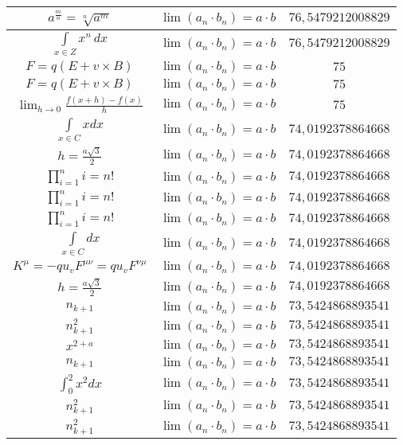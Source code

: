 \documentclass{article}
\begin{document}
\begin{flushleft}
\begin{longtable}{|c|c|c|}
$a^{\frac{m}{n}}=\sqrt[n]{a^{m}}$ & $\lim\left(a_n\cdot b_n\right)=a\cdot b$ & $76,5479212008829$ \\ \hline 
$\int \limits_{x\in Z}\!x^{n}\,dx$ & $\lim\left(a_n\cdot b_n\right)=a\cdot b$ & $76,5479212008829$ \\ \hline 
$F=q\left(E+v\times B\right)$ & $\lim\left(a_n\cdot b_n\right)=a\cdot b$ & $75$ \\ \hline 
$F=q\left(E+v\times B\right)$ & $\lim\left(a_n\cdot b_n\right)=a\cdot b$ & $75$ \\ \hline 
$\lim_{h\to0}\frac{f(x+h)-f(x)}{h}$ & $\lim\left(a_n\cdot b_n\right)=a\cdot b$ & $75$ \\ \hline 
$\int \limits_{x\in C}xdx$ & $\lim\left(a_n\cdot b_n\right)=a\cdot b$ & $74,0192378864668$ \\ \hline 
$h=\frac{a\sqrt{3}}{2}$ & $\lim\left(a_n\cdot b_n\right)=a\cdot b$ & $74,0192378864668$ \\ \hline 
$\prod_{i=1}^ni=n!$ & $\lim\left(a_n\cdot b_n\right)=a\cdot b$ & $74,0192378864668$ \\ \hline 
$\prod_{i=1}^ni=n!$ & $\lim\left(a_n\cdot b_n\right)=a\cdot b$ & $74,0192378864668$ \\ \hline 
$\prod_{i=1}^ni=n!$ & $\lim\left(a_n\cdot b_n\right)=a\cdot b$ & $74,0192378864668$ \\ \hline 
$\int \limits_{x\in C}dx$ & $\lim\left(a_n\cdot b_n\right)=a\cdot b$ & $74,0192378864668$ \\ \hline 
$K^\mu=-qu_vF^{\mu\nu}=qu_vF^{\nu\mu}$ & $\lim\left(a_n\cdot b_n\right)=a\cdot b$ & $74,0192378864668$ \\ \hline 
$h=\frac{a\sqrt{3}}{2}$ & $\lim\left(a_n\cdot b_n\right)=a\cdot b$ & $74,0192378864668$ \\ \hline 
$n_{k+1}$ & $\lim\left(a_n\cdot b_n\right)=a\cdot b$ & $73,5424868893541$ \\ \hline 
$n_{k+1}^2$ & $\lim\left(a_n\cdot b_n\right)=a\cdot b$ & $73,5424868893541$ \\ \hline 
$x^{2+a}$ & $\lim\left(a_n\cdot b_n\right)=a\cdot b$ & $73,5424868893541$ \\ \hline 
$n_{k+1}$ & $\lim\left(a_n\cdot b_n\right)=a\cdot b$ & $73,5424868893541$ \\ \hline 
$\int _0^2x^2dx$ & $\lim\left(a_n\cdot b_n\right)=a\cdot b$ & $73,5424868893541$ \\ \hline 
$n_{k+1}^2$ & $\lim\left(a_n\cdot b_n\right)=a\cdot b$ & $73,5424868893541$ \\ \hline 
$n_{k+1}^2$ & $\lim\left(a_n\cdot b_n\right)=a\cdot b$ & $73,5424868893541$ \\ \hline 

\end{longtable}
\end{flushleft}
\end{document}
